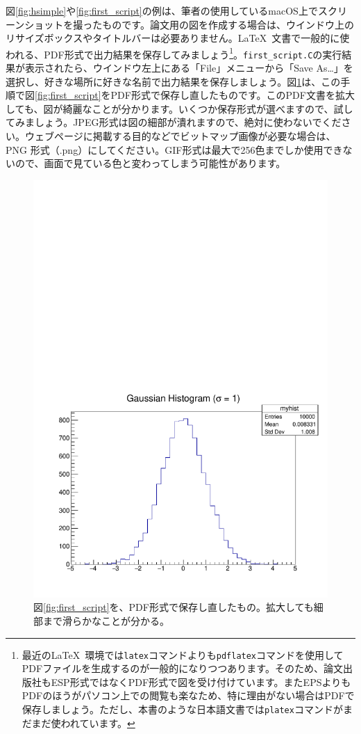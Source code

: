 図\ref{fig:hsimple}や\ref{fig:first_script}の例は、筆者の使用しているmacOS上でスクリーンショットを撮ったものです。論文用の図を作成する場合は、ウインドウ上のリサイズボックスやタイトルバーは必要ありません。\LaTeX\ 文書で一般的に使われる、PDF形式で出力結果を保存してみましょう\footnote{最近の\LaTeX\ 環境では\texttt{latex}コマンドよりも\texttt{pdflatex}コマンドを使用してPDFファイルを生成するのが一般的になりつつあります。そのため、論文出版社もESP形式ではなくPDF形式で図を受け付けています。またEPSよりもPDFのほうがパソコン上での閲覧も楽なため、特に理由がない場合はPDFで保存しましょう。ただし、本書のような日本語文書では\texttt{platex}コマンドがまだまだ使われています。}。\texttt{first\_script.C}の実行結果が表示されたら、ウインドウ左上にある「File」メニューから「Save As\ldots」を選択し、好きな場所に好きな名前で出力結果を保存しましょう。図\ref{fig:first_script_pdf}は、この手順で図\ref{fig:first_script}をPDF形式で保存し直したものです。このPDF文書を拡大しても、図が綺麗なことが分かります。いくつか保存形式が選べますので、試してみましょう。JPEG形式は図の細部が潰れますので、絶対に使わないでください。ウェブページに掲載する目的などでビットマップ画像が必要な場合は、PNG 形式（.png）にしてください。GIF形式は最大で256色までしか使用できないので、画面で見ている色と変わってしまう可能性があります。

\begin{figure}
  \centering
  \includegraphics[width=12cm,clip]{fig/first_script_pdf.pdf}
  \caption{図\ref{fig:first_script}を、PDF形式で保存し直したもの。拡大しても細部まで滑らかなことが分かる。}
  \label{fig:first_script_pdf}
\end{figure}

